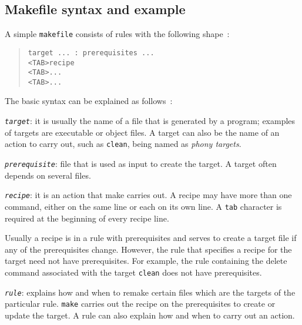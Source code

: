 \subsection{Makefile syntax and example}
\label{sec:makef-synt-example}
A simple \texttt{makefile} consists of rules with the following
shape~\cite{stallman2002gnu}:
\begin{quote}
\begin{verbatim}
target ... : prerequisites ...
<TAB>recipe
<TAB>...
<TAB>...
\end{verbatim}
\end{quote}
%
The basic syntax can be explained as follows~\cite{stallman2002gnu}:
\begin{item-c}
\item \emph{\texttt{target}}:
it is usually the name of a file that is generated by a program; examples
of targets are executable or object files. A target can also be the name of an
action to carry out, such as \texttt{clean}, being named as \emph{phony targets}. 
\item \emph{\texttt{prerequisite}}:
file that is used as input to create the target. A target
often depends on several files.
\item \emph{\texttt{recipe}}:
it is an action that make carries out. A recipe may have more than one command,
either on the same line or each on its own line. A \texttt{tab} character is
required at the beginning of every recipe line.

Usually a recipe is in a rule with prerequisites and serves to create a target
file if any of the prerequisites change.
However, the rule that specifies a recipe for the target need not
have prerequisites. For example, the rule containing the delete command
associated with the target \texttt{clean} does not have prerequisites.
\item \emph{\texttt{rule}}:
explains how and when to remake certain files which are the targets of
the particular rule. \texttt{make} carries out the recipe on the prerequisites to create or update
the target. A rule can also explain how and when to carry out an action.
\end{item-c}

